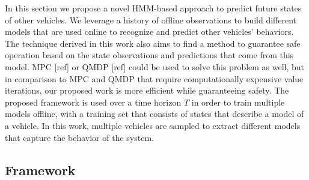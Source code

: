 \documentclass[conference]{IEEEtran}
\begin{document}
In this section we propose a novel HMM-based approach to predict future states of other vehicles. We leverage a history of offline observations to build different models that are used online to recognize and predict other vehicles' behaviors. The technique derived in this work also aims to find a method to guarantee safe operation based on the state observations and predictions that come from this model. MPC [ref] or QMDP [ref] could be used to solve this problem as well, but in comparison to MPC and QMDP that require computationally expensive value iterations, our proposed work is more efficient while guaranteeing safety. The proposed framework is used over a time horizon $T$ in order to train multiple models offline, with a training set that consists of states that describe a model of a vehicle. In this work, multiple vehicles are sampled to extract different models that capture the behavior of the system.

\subsection{Framework}
\end{document}
